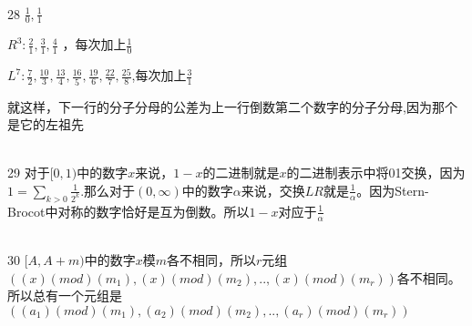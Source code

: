 \documentclass[onecolumn]{article}
\begin{document}
~\\
28 $\frac{1}{0},\frac{1}{1}$ \par
$R^{3}:\frac{2}{1},\frac{3}{1},\frac{4}{1}$ ，每次加上$\frac{1}{0}$ \par
$L^{7}:\frac{7}{2},\frac{10}{3},\frac{13}{4},\frac{16}{5},\frac{19}{6},\frac{22}{7},\frac{25}{8}$,每次加上$\frac{3}{1}$ \par
就这样，下一行的分子分母的公差为上一行倒数第二个数字的分子分母,因为那个是它的左祖先 \par
~\\
29 对于$[0,1)$中的数字$x$来说，$1-x$的二进制就是$x$的二进制表示中将01交换，因为$1=\sum_{k>0}\frac{1}{2^{k}}$.那么对于$(0,\infty )$$中的数字\alpha$来说，交换$LR$就是$\frac{1}{\alpha}$。因为Stern-Brocot中对称的数字恰好是互为倒数。所以$1-x$对应于$\frac{1}{\alpha}$\par
~\\
30 $[A,A+m)$中的数字$x$模$m$各不相同，所以$r$元组$((x)(mod)(m_{1}),(x)(mod)(m_{2}),..,(x)(mod)(m_{r}))$各不相同。所以总有一个元组是$((a_{1})(mod)(m_{1}),(a_{2})(mod)(m_{2}),..,(a_{r})(mod)(m_{r}))$ \par
~\\
\end{document}

